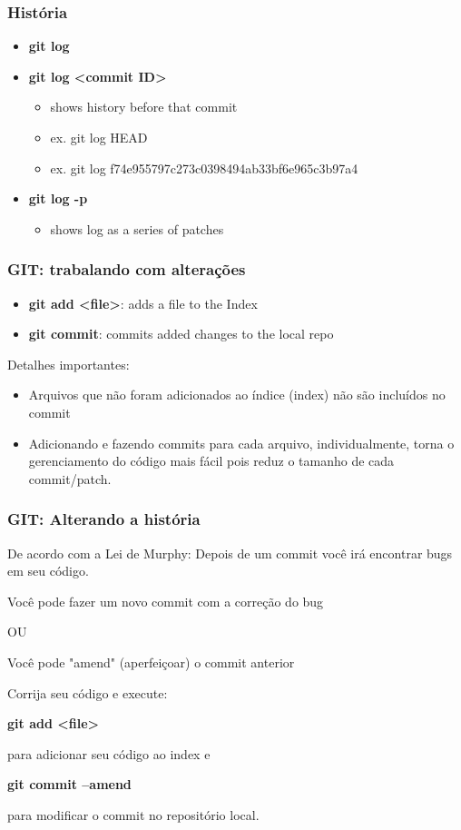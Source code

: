 \documentclass{beamer}
\begin{document}
\begin{frame}
\frametitle{História}

\begin{itemize}
\item \textbf{git log}
\item \textbf{git log <commit ID>}
\begin{itemize}
\item shows history before that commit
\item ex. git log HEAD
\item ex.  git log f74e955797c273c0398494ab33bf6e965c3b97a4
\end{itemize}
\item \textbf{git log -p}
\begin{itemize}
\item shows log as a series of patches
\end{itemize}
\end{itemize}

\end{frame}


\begin{frame}
\frametitle{GIT: trabalando com alterações}


\begin{itemize}
\item \textbf{git add <file>}: adds a file to the Index
\item \textbf{git commit}:  commits added changes to the local repo
\end{itemize}

Detalhes importantes:

\begin{itemize}
\item Arquivos que não foram adicionados ao índice (index) não são incluídos no commit
\item Adicionando e fazendo commits para cada arquivo, individualmente, torna o gerenciamento do código mais fácil pois reduz o tamanho de cada commit/patch.
\end{itemize}

\end{frame}

\begin{frame}
\frametitle{GIT: Alterando a história}

De acordo com a Lei de Murphy: Depois de um commit você irá encontrar bugs em seu código.

Você pode fazer um novo commit com a correção do bug

OU 

Você pode "amend" (aperfeiçoar) o commit anterior

Corrija seu código e execute:

\textbf{git add <file>}

para adicionar seu código ao index e

\textbf{git commit --amend}

para modificar o commit no repositório local.
\end{frame}
\end{document}

